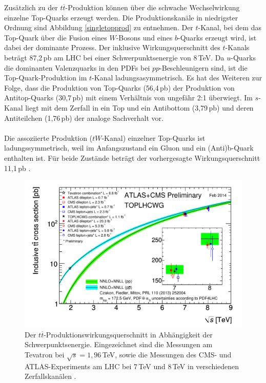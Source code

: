 Zus\"atzlich zu der $t\overline{t}$-Produktion k\"onnen \"uber die schwache Wechselwirkung einzelne Top-Quarks erzeugt werden. Die Produktionskan\"ale in niedrigster Ordnung sind Abbildung \ref{singletopprod}
zu entnehmen. Der $t$-Kanal, bei dem das Top-Quark \"uber die Fusion eines $W$-Bosons und eines $b$-Quarks erzeugt wird, ist dabei der dominante Prozess.
Der inklusive Wirkungsquerschnitt des $t$-Kanals betr\"agt 87,2\,pb am LHC bei einer Schwerpunktsenergie von 8\,TeV. Da $u$-Quarks die dominanten Valenzquarks in den PDFs bei $pp$-Beschleunigern sind,
ist die Top-Quark-Produktion im $t$-Kanal ladungsasymmetrisch. Es hat des Weiteren zur Folge, dass die Produktion von Top-Quarks (56,4\,pb) der Produktion von Antitop-Quarks (30,7\,pb) mit einem Verh\"altnis
von ungef\"ahr 2:1 \"uberwiegt. Im $s$-Kanal liegt mit dem Zerfall in ein Top und ein Antibottom (3,79\,pb) und deren Antiteilchen (1,76\,pb) der analoge Sachverhalt vor.\\
\\
Die assoziierte Produktion ($tW$-Kanal) einzelner Top-Quarks ist ladungssymmetrisch, weil im Anfangszustand ein Gluon und ein (Anti)b-Quark enthalten ist. F\"ur beide Zust\"ande betr\"agt der vorhergesagte Wirkungsquerschnitt 11,1\,pb \cite{Kidonakis:1449411}.

\begin{figure}[ht]
	\centering
	\includegraphics[scale=0.70]{Theorie/ttproductioncrosssection_new.pdf}
	\caption[Der $t\overline{t}$-Produktionswirkungsquerschnitt in Abh\"angigkeit der Schwer\-punkts\-energie]{Der $t\overline{t}$-Produktionswirkungsquerschnitt in Abh\"angigkeit der Schwer\-punkts\-energie. Eingezeichnet sind die Messungen am Tevatron bei $\sqrt{s}=1,96$\,TeV, sowie die Messungen des CMS- und ATLAS-Experiments am LHC bei 7\,TeV und 8\,TeV in verschiedenen Zerfallskan\"alen \cite{prodcrosssectionatlascms}.}
	\label{ttprodcross}
\end{figure}

